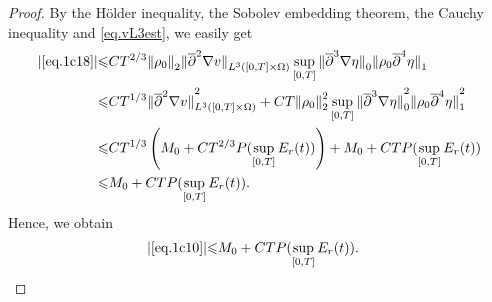 \documentclass[12pt,twoside,reqno]{amsart}
\numberwithin{equation}{section}
\theoremstyle{definition}
\theoremstyle{remark}
\begin{document}
\begin{proof}
By the H\"older inequality, the Sobolev embedding theorem, the Cauchy inequality and \eqref{eq.vL3est}, we easily get
\begin{align*}
  {\vert{\eqref{eq.1c18}}\vert}{\leqslant} &C T^{2/3}{\Vert{\rho_0}\Vert}_2{\Vert{{\overline{\partial}}^2{\nabla} v}\Vert}_{L^3([0,T]\times\Omega)}\sup_{[0,T]}{\Vert{{\overline{\partial}}^3{\nabla}\eta}\Vert}_0 {\Vert{{\rho_0} {\overline{\partial}}^4\eta}\Vert}_1\\
  {\leqslant}&CT^{1/3}{\Vert{{\overline{\partial}}^2{\nabla} v}\Vert}_{L^3([0,T]\times\Omega)}^2+CT{\Vert{\rho_0}\Vert}_2^2\sup_{[0,T]}{\Vert{{\overline{\partial}}^3{\nabla}\eta}\Vert}_0^2 {\Vert{{\rho_0} {\overline{\partial}}^4\eta}\Vert}_1^2\\
  {\leqslant}&CT^{1/3}\left(M_0+CT^{2/3}P(\sup_{[0,T]}E_r(t))\right)+M_0+CT P(\sup_{[0,T]}E_r(t))\\
  {\leqslant}&M_0+CT P(\sup_{[0,T]}E_r(t)).
\end{align*}
Hence, we obtain
\begin{align*}
  {\vert{\eqref{eq.1c10}}\vert}{\leqslant}&M_0+CT P(\sup_{[0,T]}E_r(t)).
\end{align*}


\end{proof}
\end{document}
